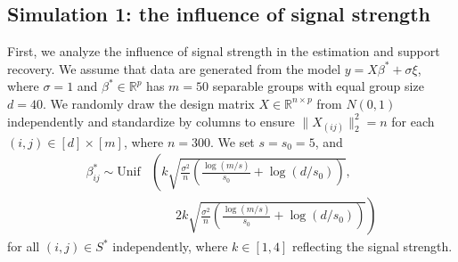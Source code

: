 \documentclass[12pt]{article}
\begin{document}
\subsection{Simulation 1: the influence of signal strength}\label{num1}
First, we analyze the influence of signal strength in the estimation and support recovery.
We assume that data are generated from the model $y = X \beta^* + \sigma \xi$, where $\sigma=1$ and $\beta^* \in \mathbb R^p$ has $m=50$ separable groups with equal group size $d=40$. 
We randomly draw the design matrix $X \in \mathbb R^{n \times p}$ from $N(0,1)$ independently and standardize by columns to ensure $\| X_{(ij)} \|_2^2 = n$ for each $(i,j) \in [d] \times [m]$, where $n = 300$. 
We set $s = s_0 = 5$, and 
\begin{equation}\label{eq: k}
\begin{aligned}
\beta_{ij}^* \sim 
\text{Unif}& \left(  k\sqrt{\frac{\sigma^2}n\left( \frac{\log(m/s)}{s_0} + \log(d/s_0)\right)} , \right.\\
 & \qquad \left.2k \sqrt{\frac{\sigma^2}n\left( \frac{\log(m/s)}{s_0} + \log(d/s_0)\right)} \right )
\end{aligned}
\end{equation}
for all $ (i,j) \in S^*$ independently, where $k \in [1,4]$ reflecting the signal strength.

\end{document}
